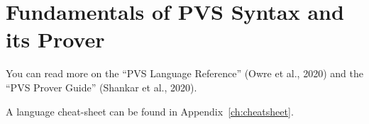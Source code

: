 \chapter{Fundamentals of PVS Syntax and its Prover}

You can read more on the ``PVS Language Reference'' (Owre et al., 2020) and the ``PVS Prover Guide'' (Shankar et al., 2020).

A language cheat-sheet can be found in Appendix~\ref{ch:cheatsheet}.